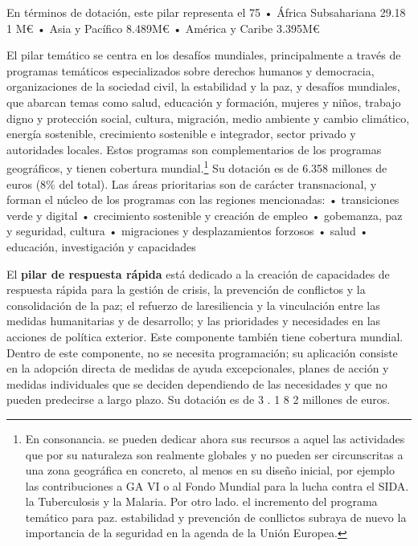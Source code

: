 \documentclass[10pt,a4paper]{article}
\begin{document}
{En términos de dotación, este pilar representa el 75%
• África Subsahariana 29.18 1 M€
• Asia y Pacífico 8.489M€
• América y Caribe 3.395M€ 

El pilar temático se centra en los desafíos mundiales, principalmente a través de programas temáticos especializados sobre derechos humanos y democracia, organizaciones de la sociedad civil, la estabilidad y la paz, y desafíos mundiales, que abarcan temas como salud, educación y formación, mujeres y niños, trabajo digno y protección social, cultura, migración, medio ambiente y cambio climático, energía sostenible, crecimiento sostenible e integrador, sector privado y autoridades locales. Estos programas son complementarios de los programas geográficos, y tienen cobertura mundial.\footnote{%
    En consonancia. se pueden dedicar ahora sus recursos a aquel las actividades que por su naturaleza son realmente globales y no pueden ser circunscritas a una zona geográfica en concreto, al menos en su diseño inicial, por ejemplo las contribuciones a GA VI o al Fondo Mundial para la lucha contra el SIDA. la Tuberculosis y la Malaria. Por otro lado. el incremento del programa temático para paz. estabilidad y prevención de conllictos subraya de nuevo la importancia de la seguridad en la agenda de la Unión Europea.
} Su dotación es de 6.358 millones de euros (8\% del total). Las áreas prioritarias son de carácter transnacional, y forman el núcleo de los programas con las regiones mencionadas:
• transiciones verde y digital
• crecimiento sostenible y creación de empleo
• gobemanza, paz y seguridad, cultura
• migraciones y desplazamientos forzosos
• salud
• educación, investigación y capacidades

El \textbf{pilar de respuesta rápida} está dedicado a la creación de capacidades de respuesta rápida para la gestión de crisis, la prevención de conflictos y la consolidación de la paz; el refuerzo de laresiliencia y la vinculación entre las medidas humanitarias y de desarrollo; y las prioridades y necesidades en las acciones de política exterior. Este componente también tiene cobertura mundial. Dentro de este componente, no se necesita programación; su aplicación consiste en la adopción directa de medidas de ayuda excepcionales, planes de acción y medidas individuales que se deciden dependiendo de las necesidades y que no pueden predecirse a largo plazo. Su dotación es de 3 . 1 8 2 millones de euros.

}
\end{document}

